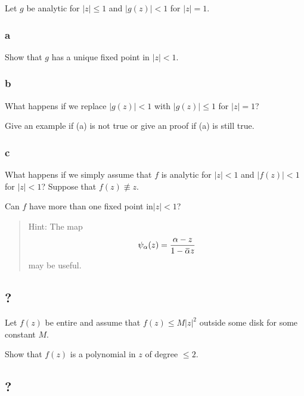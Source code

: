 Let \(g\) be analytic for \(|z|\leq 1\) and \(|g(z)| < 1\) for
\(|z| = 1\).

\hypertarget{a}{%
\subsubsection{a}\label{a}}

Show that \(g\) has a unique fixed point in \(|z| < 1\).

\hypertarget{b}{%
\subsubsection{b}\label{b}}

What happens if we replace \(|g(z)| < 1\) with \(|g(z)|\leq 1\) for
\(|z|=1\)?

Give an example if (a) is not true or give an proof if (a) is still
true.

\hypertarget{c}{%
\subsubsection{c}\label{c}}

What happens if we simply assume that \(f\) is analytic for \(|z| < 1\)
and \(|f(z)| < 1\) for \(|z| < 1\)? Suppose that \(f(z)\not\equiv z\).

Can \(f\) have more than one fixed point in\(|z| < 1\)?

\begin{quote}
Hint: The map
\begin{align*}\displaystyle{\psi_{\alpha}(z)=\frac{\alpha-z}{1-\mkern 1.5mu\overline{\mkern-1.5mu\alpha\mkern-1.5mu}\mkern 1.5muz}}\end{align*}
may be useful.
\end{quote}

\hypertarget{section-22}{%
\subsection{?}\label{section-22}}

Let \(f(z)\) be entire and assume that \(f(z) \leq M |z|^2\) outside
some disk for some constant \(M\).

Show that \(f(z)\) is a polynomial in \(z\) of degree \(\leq 2\).

\hypertarget{section-23}{%
\subsection{?}\label{section-23}}

